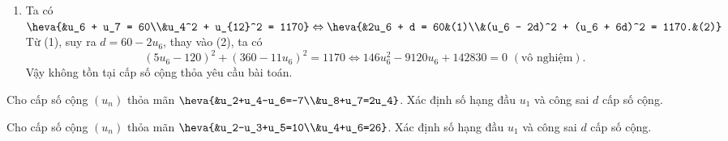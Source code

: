 \begin{bt}
{\begin{enumerate}
			Vậy số hạng đầu của cấp số cộng là $u_1 = 3$, công sai là $d = 2$ hoặc $u_1 = -17$, $d = 2$.
			\item Ta có $\heva{&u_6 + u_7 = 60\\&u_4^2 + u_{12}^2 = 1170} \Leftrightarrow \heva{&2u_6 + d = 60&(1)\\&(u_6 - 2d)^2 + (u_6 + 6d)^2 = 1170.&(2)}$\\
			Từ (1), suy ra $d = 60 - 2u_6$, thay vào (2), ta có
			$$(5u_6 - 120)^2 + (360 - 11u_6)^2 = 1170 \Leftrightarrow 146u_6^2 - 9120u_6 + 142830 = 0 \,\, (\text{vô nghiệm}).$$ 
			Vậy không tồn tại cấp số cộng thỏa yêu cầu bài toán.
		\end{enumerate}
	}
\end{bt}
	

\begin{bt}%
	Cho cấp số cộng $ (u_n) $ thỏa mãn $ \heva{&u_2+u_4-u_6=-7\\&u_8+u_7=2u_4} $. Xác định số hạng đầu $ u_1 $ và công sai $ d $ cấp số cộng.        
	
\end{bt}

\begin{bt}%
Cho cấp số cộng $ (u_n) $ thỏa mãn $ \heva{&u_2-u_3+u_5=10\\&u_4+u_6=26} $. Xác định số hạng đầu $ u_1 $ và công sai $ d $ cấp số cộng.         
\end{bt}

